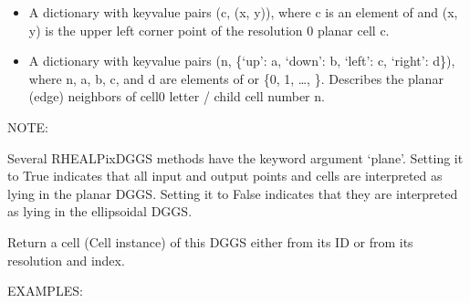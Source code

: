 \documentclass[a4paper,12ptopenany,oneside,english]{sphinxmanual}
\begin{document}
\begin{fulllineitems}
\begin{itemize}
\item {} 
\sphinxAtStartPar
{} \sphinxhyphen{} A dictionary with key\sphinxhyphen{}value pairs (c, (x, y)), where
c is an element of  and (x, y) is the upper left corner point
of the resolution 0 planar cell c.

\item {} 
\sphinxAtStartPar
{} \sphinxhyphen{} A dictionary with key\sphinxhyphen{}value pairs
(n, \{‘up’: a, ‘down’: b, ‘left’: c, ‘right’: d\}),
where n, a, b, c, and d are elements of  or
\{0, 1, …, \}.
Describes the planar (edge) neighbors of cell0 letter / child cell number
n.

\end{itemize}

\sphinxAtStartPar
NOTE:

\sphinxAtStartPar
Several RHEALPixDGGS methods have the keyword argument ‘plane’.
Setting it to True indicates that all input and output points and cells are
interpreted as lying in the planar DGGS.
Setting it to False indicates that they are interpreted as lying in
the ellipsoidal DGGS.

\begin{fulllineitems}
\label{\detokenize{dggs:rhealpixdggs.dggs.RHEALPixDGGS.cell}}
\pysigstartsignatures
\pysiglinewithargsret
{}
{\sphinxparamcomma {}\sphinxparamcomma {}}
{}
\pysigstopsignatures
\sphinxAtStartPar
Return a cell (Cell instance) of this DGGS either from its ID or
from its resolution and index.

\sphinxAtStartPar
EXAMPLES:

\begin{sphinxVerbatim}[commandchars=\\\{\}]
  
    
 
\end{sphinxVerbatim}


\end{fulllineitems}
\end{fulllineitems}
\end{document}
